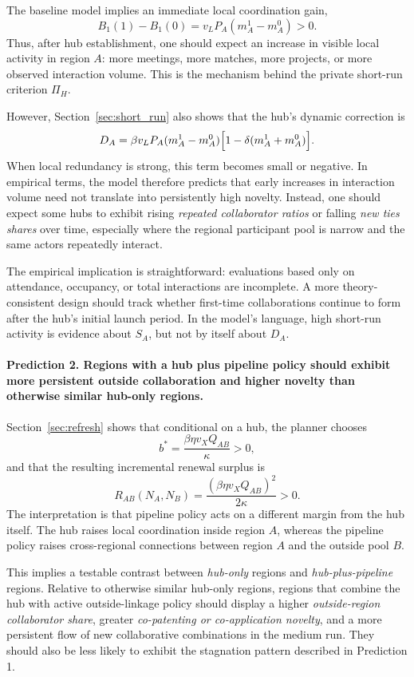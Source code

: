 The baseline model implies an immediate local coordination gain,
\[
B_1(1)-B_1(0)=v_LP_A(m_A^1-m_A^0)>0.
\]
Thus, after hub establishment, one should expect an increase in visible local activity in region $A$: more meetings, more matches, more projects, or more observed interaction volume. This is the mechanism behind the private short-run criterion $\Pi_H$.

However, Section~\ref{sec:short_run} also shows that the hub's dynamic correction is
\[
D_A=\beta v_LP_A(m_A^1-m_A^0)\Bigl[1-\delta(m_A^1+m_A^0)\Bigr].
\]
When local redundancy is strong, this term becomes small or negative. In empirical terms, the model therefore predicts that early increases in interaction volume need not translate into persistently high novelty. Instead, one should expect some hubs to exhibit rising \emph{repeated collaborator ratios} or falling \emph{new ties shares} over time, especially where the regional participant pool is narrow and the same actors repeatedly interact.

The empirical implication is straightforward: evaluations based only on attendance, occupancy, or total interactions are incomplete. A more theory-consistent design should track whether first-time collaborations continue to form after the hub's initial launch period. In the model's language, high short-run activity is evidence about $S_A$, but not by itself about $D_A$.

\paragraph{Prediction 2. Regions with a hub plus pipeline policy should exhibit more persistent outside collaboration and higher novelty than otherwise similar hub-only regions.}

Section~\ref{sec:refresh} shows that conditional on a hub, the planner chooses
\[
b^*=\frac{\beta\eta v_XQ_{AB}}{\kappa}>0,
\]
and that the resulting incremental renewal surplus is
\[
R_{AB}(N_A,N_B)=\frac{(\beta\eta v_XQ_{AB})^2}{2\kappa}>0.
\]
The interpretation is that pipeline policy acts on a different margin from the hub itself. The hub raises local coordination inside region $A$, whereas the pipeline policy raises cross-regional connections between region $A$ and the outside pool $B$.

This implies a testable contrast between \emph{hub-only} regions and \emph{hub-plus-pipeline} regions. Relative to otherwise similar hub-only regions, regions that combine the hub with active outside-linkage policy should display a higher \emph{outside-region collaborator share}, greater \emph{co-patenting or co-application novelty}, and a more persistent flow of new collaborative combinations in the medium run. They should also be less likely to exhibit the stagnation pattern described in Prediction 1.

